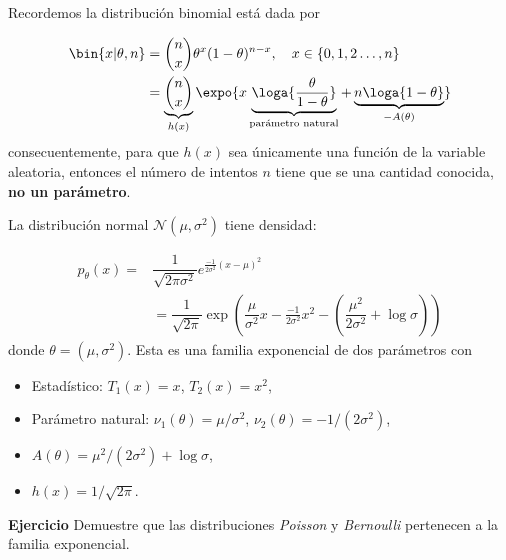 \begin{example}
Recordemos la distribución binomial está dada por 

\begin{align*}
	\bin{x|\theta,n} 	&=\binom{n}{x}\theta^x(1-\theta)^{n-x},\quad x\in\{0,1,2\ldots,n\}\\
					&=
					\underbrace{\binom{n}{x}}_{h(x)}\expo{x\underbrace{\loga{\frac{\theta}{1-\theta}}}_{\text{parámetro natural}} + \underbrace{n\loga{1-\theta}}_{-{A(\theta)}}}\\
\end{align*}
consecuentemente, para que $h(x)$ sea únicamente una función de la variable aleatoria, entonces el número de intentos $n$ tiene que se una cantidad conocida, \textbf{no un parámetro}. 	
 \end{example} 

\begin{example} 
La distribución normal $\mathcal{N}(\mu,\sigma^{2})$ tiene densidad:

\begin{align}
    p_{\theta}(x) = &  \dfrac{1}{\sqrt{2\pi \sigma^{2}}} e^{\frac{-1}{2\sigma^{2}}(x-\mu)^{2}}\\
    & = \dfrac{1}{\sqrt{2\pi}}\exp\left(\dfrac{\mu}{\sigma^{2}}x -\frac{-1}{2\sigma^{2}}x^{2} - \left(\dfrac{\mu^{2}}{2\sigma^{2}} + \log \sigma \right)\right)
\end{align}
donde $\theta = (\mu, \sigma^{2})$. Esta es una familia exponencial de dos parámetros con
\begin{itemize}
    \item Estadístico: $T_{1}(x) = x$, $T_{2} (x) = x^2$,
    \item Parámetro natural: $\nu_{1}(\theta) = \mu/\sigma^{2}$, $\nu_{2}(\theta) = -1/(2\sigma^{2})$,
    \item $A(\theta) = \mu^{2}/(2\sigma^{2}) + \log \sigma $,
    \item $h(x) = 1/\sqrt{2\pi}$.
\end{itemize}  

\end{example}

\begin{example} \textbf{Ejercicio} Demuestre que las distribuciones \emph{Poisson} y \emph{Bernoulli} pertenecen a la familia exponencial. 

\end{example}

